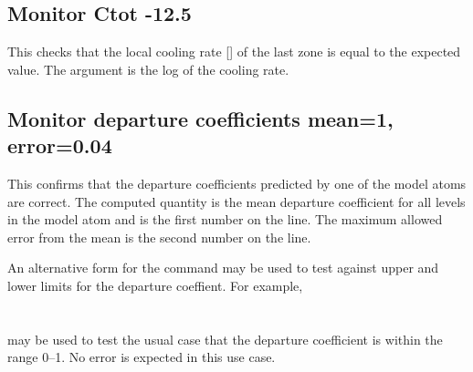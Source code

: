 \subsection{Monitor Ctot -12.5}

This checks that the local cooling rate [\ergpccmps ]
of the last zone is equal to the expected value.
The argument is the log of the cooling rate.

\subsection{Monitor departure coefficients  mean=1, error=0.04}

This confirms that the departure coefficients predicted by one of the
model atoms are correct.
The computed quantity is the mean departure coefficient for all levels
in the model atom and is the first number on the line.
The maximum allowed error from the mean is the second number on the line.

An alternative form for the command may be used to test against upper
and lower limits for the departure coeffient.
For example,\\
%
\\
\\
%
\noindent
may be used to test the usual case that the departure coefficient
is within the range 0--1.
No error is expected in this use case.

